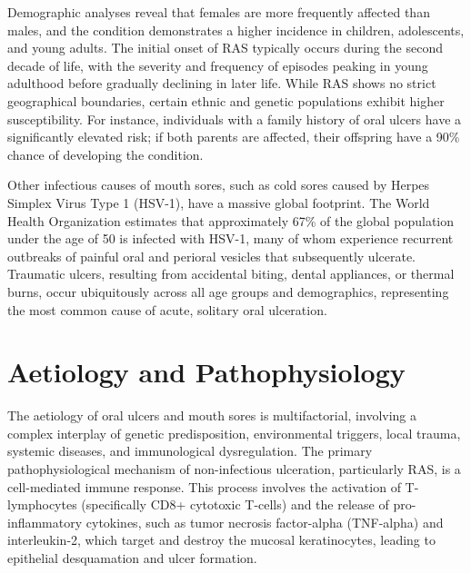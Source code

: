 Demographic analyses reveal that females are more frequently affected than males, and the condition demonstrates a higher incidence in children, adolescents, and young adults. The initial onset of RAS typically occurs during the second decade of life, with the severity and frequency of episodes peaking in young adulthood before gradually declining in later life. While RAS shows no strict geographical boundaries, certain ethnic and genetic populations exhibit higher susceptibility. For instance, individuals with a family history of oral ulcers have a significantly elevated risk; if both parents are affected, their offspring have a 90\% chance of developing the condition.

Other infectious causes of mouth sores, such as cold sores caused by Herpes Simplex Virus Type 1 (HSV-1), have a massive global footprint. The World Health Organization estimates that approximately 67\% of the global population under the age of 50 is infected with HSV-1, many of whom experience recurrent outbreaks of painful oral and perioral vesicles that subsequently ulcerate. Traumatic ulcers, resulting from accidental biting, dental appliances, or thermal burns, occur ubiquitously across all age groups and demographics, representing the most common cause of acute, solitary oral ulceration.

\section*{Aetiology and Pathophysiology}
The aetiology of oral ulcers and mouth sores is multifactorial, involving a complex interplay of genetic predisposition, environmental triggers, local trauma, systemic diseases, and immunological dysregulation. The primary pathophysiological mechanism of non-infectious ulceration, particularly RAS, is a cell-mediated immune response. This process involves the activation of T-lymphocytes (specifically CD8+ cytotoxic T-cells) and the release of pro-inflammatory cytokines, such as tumor necrosis factor-alpha (TNF-alpha) and interleukin-2, which target and destroy the mucosal keratinocytes, leading to epithelial desquamation and ulcer formation.

